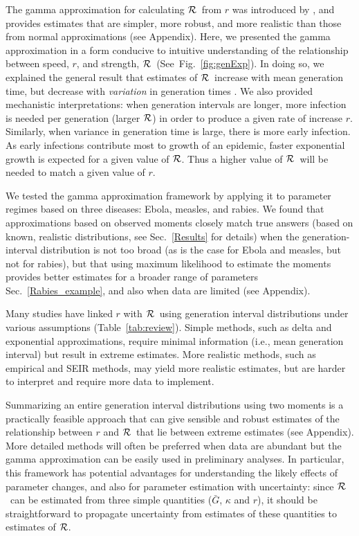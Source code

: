 \documentclass[12pt]{article}
\newcommand{\RR}{\ensuremath{{\cal R}}}
\newcommand{\fref}[1]{Fig.~\ref{fig:#1}}
\newcommand{\sref}[1]{Sec.~\ref{#1}}
\newcommand{\tref}[1]{Table~\ref{tab:#1}}
\begin{document}
The gamma approximation for calculating \RR\ from $r$ was introduced by \cite{NishCast09}, and provides estimates that are simpler, more robust, and more realistic than those from normal approximations (see Appendix).
Here, we presented the gamma approximation in a form conducive to intuitive understanding of the relationship between speed, $r$, and strength, \RR\ (See~\fref{genExp}).
In doing so, we explained the general result that estimates of \RR\ increase with mean generation time, but decrease with \emph{variation} in generation times \cite{WallLips07, wearing2005appropriate, roberts2007model}.
We also provided mechanistic interpretations: when generation intervals are longer, more infection is needed per generation (larger \RR)  in order to produce a given rate of increase $r$. 
Similarly, when variance in generation time is large, there is more early infection.
As early infections contribute most to growth of an epidemic, faster exponential growth is expected for a given value of \RR.
Thus a higher value of \RR\ will be needed to match a given value of $r$. 

We tested the gamma approximation framework by applying it to parameter regimes based on three diseases: Ebola, measles, and rabies. 
We found that approximations based on observed moments closely match true answers (based on known, realistic distributions, see \sref{Results} for details) when the generation-interval distribution is not too broad (as is the case for Ebola and measles, but not for rabies), but that using maximum likelihood to estimate the moments provides better estimates for a broader range of parameters \sref{Rabies_example}, and also when data are limited (see Appendix).

Many studies have linked $r$ with \RR\ using generation interval distributions under various assumptions (\tref{review}).
Simple methods, such as delta and exponential approximations, require minimal information (i.e., mean generation interval) but result in extreme estimates. 
More realistic methods, such as empirical and SEIR methods, may yield more realistic estimates, but are harder to interpret and require more data to implement. 

Summarizing an entire generation interval distributions using two moments is a practically feasible approach that can give sensible and robust estimates of the relationship between $r$ and \RR\ that lie between extreme estimates (see Appendix).
More detailed methods will often be preferred when data are abundant but the gamma approximation can be easily used in preliminary analyses.
In particular, this framework has potential advantages for understanding the likely effects of parameter changes, and also for parameter estimation with uncertainty: since \RR\ can be estimated from three simple quantities ($\bar G$, $\kappa$ and $r$), it should be straightforward to propagate uncertainty from estimates of these quantities to estimates of \RR.
\end{document}
